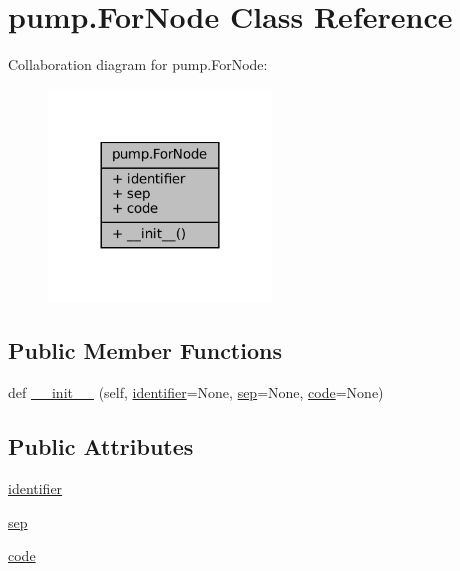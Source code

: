 \hypertarget{classpump_1_1ForNode}{}\section{pump.\+For\+Node Class Reference}
\label{classpump_1_1ForNode}


Collaboration diagram for pump.\+For\+Node\+:
\nopagebreak
\begin{figure}[H]
\begin{center}
\leavevmode
\includegraphics[width=168pt]{classpump_1_1ForNode__coll__graph}
\end{center}
\end{figure}
\subsection*{Public Member Functions}
\begin{DoxyCompactItemize}
\item 
def \hyperlink{classpump_1_1ForNode_a9cf60468cacdb06acce35074ab2a2b55}{\+\_\+\+\_\+init\+\_\+\+\_\+} (self, \hyperlink{classpump_1_1ForNode_a2444199e135e43696b3a006bd0d38982}{identifier}=None, \hyperlink{classpump_1_1ForNode_a06b493278b3c1ad53363a2bcc3b8efb3}{sep}=None, \hyperlink{classpump_1_1ForNode_afdb5f4f2a3bc772bbc6ea777dfde898e}{code}=None)
\end{DoxyCompactItemize}
\subsection*{Public Attributes}
\begin{DoxyCompactItemize}
\item 
\hyperlink{classpump_1_1ForNode_a2444199e135e43696b3a006bd0d38982}{identifier}
\item 
\hyperlink{classpump_1_1ForNode_a06b493278b3c1ad53363a2bcc3b8efb3}{sep}
\item 
\hyperlink{classpump_1_1ForNode_afdb5f4f2a3bc772bbc6ea777dfde898e}{code}
\end{DoxyCompactItemize}


